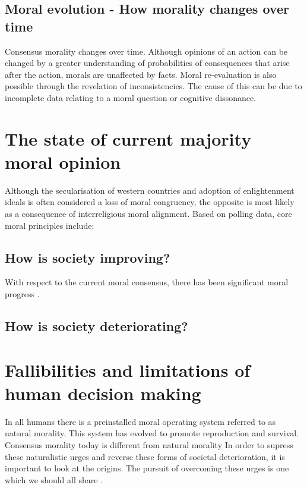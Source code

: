 \documentclass{book}
\begin{document}
\subsection{Moral evolution - How morality changes over time}
Consensus morality changes over time.
Although opinions of an action can be changed by a greater understanding of probabilities of consequences that arise after the action, morals are unaffected by facts.
Moral re-evaluation is also possible through the revelation of inconsistencies.
The cause of this can be due to incomplete data relating to a moral question or cognitive dissonance.

\section{The state of current majority moral opinion}
Although the secularisation of western countries and adoption of enlightenment ideals is often considered a loss of moral congruency, the opposite is most likely as a consequence of interreligious moral alignment.
Based on polling data, core moral principles include:

\subsection{How is society improving?}
With respect to the current moral consensus, there has been significant moral progress \cite{pinker2011better}.

\subsection{How is society deteriorating?}

\section{Fallibilities and limitations of human decision making}
In all humans there is a preinstalled moral operating system referred to as natural morality.
This system has evolved to promote reproduction and survival.
Consensus morality today is different from natural morality
In order to supress these naturalistic urges and reverse these forms of societal deterioration, it is important to look at the origins.
The pursuit of overcoming these urges is one which we should all share \cite{nietzsche1968will}.
\end{document}
